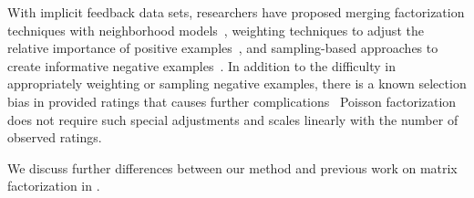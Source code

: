 With implicit feedback data sets, researchers have proposed merging
factorization techniques with neighborhood models~\cite{Koren:2008},
weighting techniques to adjust the relative importance of positive
examples~\cite{Hu:2008p9402}, and sampling-based approaches to create
informative negative
examples~\cite{Gantner:2012p9364,Dror:2012a,Paquet:2013p9197}.  In
addition to the difficulty in appropriately weighting or sampling
negative examples, there is a known selection bias in provided ratings
that causes further complications~\cite{Marlin:2009,Marlin:2012}
Poisson factorization does not require such special adjustments and
scales linearly with the number of observed ratings.

We discuss further differences between our method and previous work on
matrix factorization in .

